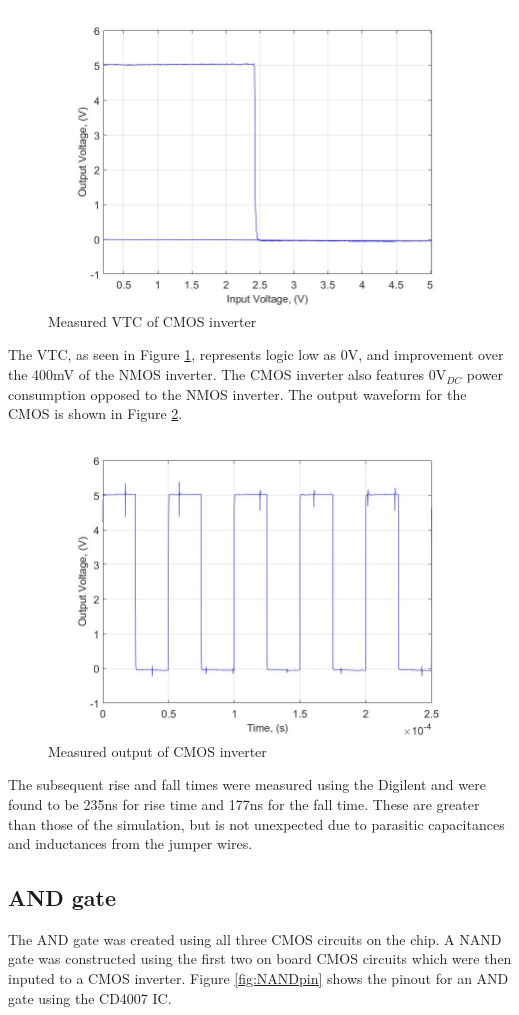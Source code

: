 \begin{figure}[H]
    \centering
    \includegraphics[width=.6\textwidth]{ExperimentalImplementation/CMOS_VTC_exp.jpg}
    \caption{Measured VTC of CMOS inverter}
    \label{fig:CMOSvtc}
\end{figure}

The VTC, as seen in Figure \ref{fig:CMOSvtc},  represents logic low as 0V, and improvement over the 400mV of the NMOS inverter. The CMOS inverter also features 0V$_{DC}$ power consumption opposed to the NMOS inverter. The output waveform for the CMOS is shown in Figure \ref{fig:CMOSout}.

\begin{figure}[H]
    \centering
    \includegraphics[width=.6\textwidth]{ExperimentalImplementation/cmos_waveform.jpg}
    \caption{Measured output of CMOS inverter}
    \label{fig:CMOSout}
\end{figure}

The subsequent rise and fall times were measured using the Digilent and were found to be 235ns for rise time and 177ns for the fall time. These are greater than those of the simulation, but is not unexpected due to parasitic capacitances and inductances from the jumper wires.


\subsection{AND gate}
The AND gate was created using all three CMOS circuits on the chip. A NAND gate was constructed using the first two on board CMOS circuits which were then inputed to a CMOS inverter. Figure \ref{fig:NANDpin} shows the pinout for an AND gate using the CD4007 IC.


